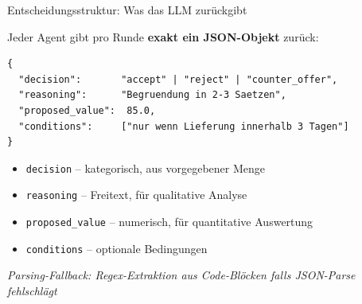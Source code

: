 \documentclass[aspectratio=169, 12pt]{beamer}
\begin{document}
\begin{frame}[fragile]{Entscheidungsstruktur: Was das LLM zur\"uckgibt}

Jeder Agent gibt pro Runde \textbf{exakt ein JSON-Objekt} zur\"uck:

\vspace{0.3cm}

\begin{lstlisting}[language={}]
{
  "decision":       "accept" | "reject" | "counter_offer",
  "reasoning":      "Begruendung in 2-3 Saetzen",
  "proposed_value":  85.0,
  "conditions":     ["nur wenn Lieferung innerhalb 3 Tagen"]
}
\end{lstlisting}

\vspace{0.4cm}

\begin{itemize}
    \item \texttt{decision} -- kategorisch, aus vorgegebener Menge
    \item \texttt{reasoning} -- Freitext, für qualitative Analyse
    \item \texttt{proposed\_value} -- numerisch, für quantitative Auswertung
    \item \texttt{conditions} -- optionale Bedingungen
\end{itemize}

\vspace{0.3cm}
\small\textit{Parsing-Fallback: Regex-Extraktion aus Code-Bl\"ocken falls JSON-Parse fehlschl\"agt}

\end{frame}
\end{document}
